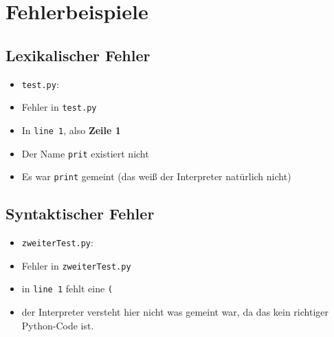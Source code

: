 \section{Fehlerbeispiele}
\subsection{Lexikalischer Fehler}
\begin{frame}
    \slidehead
    \begin{itemize}
        \item \texttt{test.py}:
            \pause
            \pause
        \item Fehler in \texttt{test.py}
            \pause
        \item In \texttt{line 1}, also \textbf{Zeile 1}
            \pause
        \item Der Name \texttt{prit} existiert nicht
            \pause
        \item Es war \texttt{print} gemeint (das weiß der Interpreter natürlich nicht)
    \end{itemize}
\end{frame}

\subsection{Syntaktischer Fehler}

\begin{frame}
    \slidehead
    \begin{itemize}
        \item \texttt{zweiterTest.py}:
            \pause
            \pause
        \item Fehler in \texttt{zweiterTest.py}
            \pause
        \item in \texttt{line 1} fehlt eine \texttt{(}
        \item der Interpreter versteht hier nicht was gemeint war, da das kein richtiger Python-Code ist.
    \end{itemize}
\end{frame}

